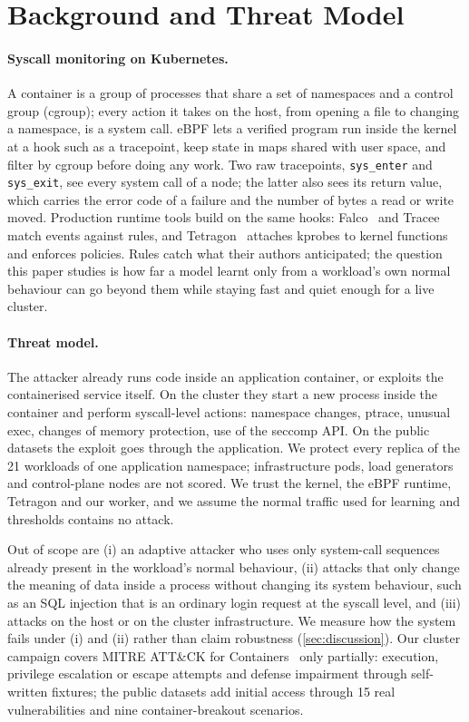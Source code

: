 \section{Background and Threat Model}\label{sec:background}

\paragraph{Syscall monitoring on Kubernetes.}
A container is a group of processes that share a set of namespaces and a control group (cgroup); every action it takes
on the host, from opening a file to changing a namespace, is a system call. eBPF lets a verified program run inside the
kernel at a hook such as a tracepoint, keep state in maps shared with user space, and filter by cgroup before doing any
work. Two raw tracepoints, \texttt{sys\_enter} and \texttt{sys\_exit}, see every system call of a node; the latter also
sees its return value, which carries the error code of a failure and the number of bytes a read or write moved.
Production runtime tools build on the same hooks: Falco~\cite{falco} and Tracee~\cite{tracee} match events against
rules, and Tetragon~\cite{tetragon} attaches kprobes to kernel functions and enforces policies. Rules catch what their
authors anticipated; the question this paper studies is how far a model learnt only from a workload's own normal
behaviour can go beyond them while staying fast and quiet enough for a live cluster.

\paragraph{Threat model.}
The attacker already runs code inside an application container, or exploits the containerised service itself. On the
cluster they start a new process inside the container and perform syscall-level actions: namespace changes, ptrace,
unusual exec, changes of memory protection, use of the seccomp API. On the public datasets the exploit goes through
the application. We protect every replica of the 21 workloads of one application namespace; infrastructure pods, load
generators and control-plane nodes are not scored. We trust the kernel, the eBPF runtime, Tetragon and our worker, and
we assume the normal traffic used for learning and thresholds contains no attack.

Out of scope are (i) an adaptive attacker who uses only system-call sequences already present in the workload's
normal behaviour, (ii) attacks that only change the meaning of data inside a process without changing its system
behaviour, such as an SQL injection that is an ordinary login request at the syscall level, and (iii) attacks on the
host or on the cluster infrastructure. We measure how the system fails under (i) and (ii) rather than claim robustness
(\cref{sec:discussion}). Our cluster campaign covers MITRE ATT\&CK for Containers~\cite{attack_containers} only
partially: execution, privilege escalation or escape attempts and defense impairment through self-written fixtures;
the public datasets add initial access through 15 real vulnerabilities and nine container-breakout scenarios.
